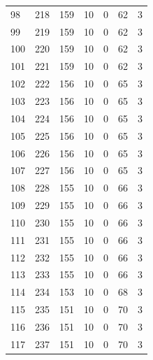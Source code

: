 \documentclass[a4paper,twoside,12pt]{book}
\begin{document}
\begin{appendices}
\begin{table}
\begin{tabular}{lrrrrrr}
		98  &    218 &       159 &        10 &               0 &              62 &         3 \\
		99  &    219 &       159 &        10 &               0 &              62 &         3 \\
		100 &    220 &       159 &        10 &               0 &              62 &         3 \\
		101 &    221 &       159 &        10 &               0 &              62 &         3 \\
		102 &    222 &       156 &        10 &               0 &              65 &         3 \\
		103 &    223 &       156 &        10 &               0 &              65 &         3 \\
		104 &    224 &       156 &        10 &               0 &              65 &         3 \\
		105 &    225 &       156 &        10 &               0 &              65 &         3 \\
		106 &    226 &       156 &        10 &               0 &              65 &         3 \\
		107 &    227 &       156 &        10 &               0 &              65 &         3 \\
		108 &    228 &       155 &        10 &               0 &              66 &         3 \\
		109 &    229 &       155 &        10 &               0 &              66 &         3 \\
		110 &    230 &       155 &        10 &               0 &              66 &         3 \\
		111 &    231 &       155 &        10 &               0 &              66 &         3 \\
		112 &    232 &       155 &        10 &               0 &              66 &         3 \\
		113 &    233 &       155 &        10 &               0 &              66 &         3 \\
		114 &    234 &       153 &        10 &               0 &              68 &         3 \\
		115 &    235 &       151 &        10 &               0 &              70 &         3 \\
		116 &    236 &       151 &        10 &               0 &              70 &         3 \\
		117 &    237 &       151 &        10 &               0 &              70 &         3 \\

\end{tabular}
\end{table}
\end{appendices}
\end{document}
